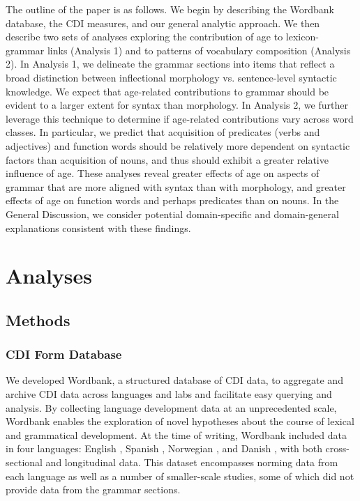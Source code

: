 \documentclass[10pt,letterpaper]{article}
\begin{document}
The outline of the paper is as follows. We begin by describing the Wordbank database, the CDI measures, and our general analytic approach. We then describe two sets of analyses exploring the contribution of age to lexicon-grammar links (Analysis 1) and to patterns of vocabulary composition (Analysis 2). In Analysis 1, we delineate the grammar sections into items that reflect a broad distinction between inflectional morphology vs. sentence-level syntactic knowledge. We expect that age-related contributions to grammar should be evident to a larger extent for syntax than morphology.  In Analysis 2, we further leverage this technique to determine if age-related contributions vary across word classes. In particular, we predict that acquisition of predicates (verbs and adjectives) and function words should be relatively more dependent on syntactic factors than acquisition of nouns, and thus should exhibit a greater relative influence of age. These analyses reveal greater effects of age on aspects of grammar that are more aligned with syntax than with morphology, and greater effects of age on function words and perhaps predicates than on nouns. In the General Discussion, we consider potential domain-specific and domain-general explanations consistent with these findings.

\section{Analyses}

\subsection{Methods}

\subsubsection{CDI Form Database}

We developed Wordbank, a structured database of CDI data, to aggregate and archive CDI data across languages and labs and facilitate easy querying and analysis. By collecting language development data at an unprecedented scale, Wordbank enables the exploration of novel hypotheses about the course of lexical and grammatical development. At the time of writing, Wordbank included data in four languages: English \cite{fenson2007}, Spanish \cite{jackson1993}, Norwegian \cite{simonsen2014}, and Danish \cite{bleses2008}, with both cross-sectional and longitudinal data. This dataset encompasses norming data from each language as well as a number of smaller-scale studies, some of which did not provide data from the grammar sections. %
\end{document}
